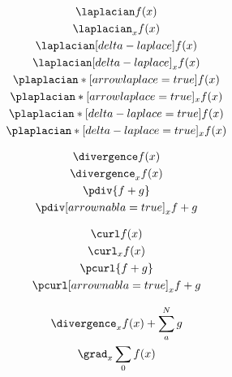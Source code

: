 \documentclass[parskip=half]{scrartcl}
\begin{document}
\begin{SideBySideExample}[xrightmargin=.3\textwidth,gobble=2]
  \begin{gather*}
    \laplacian f(x)\\
    \laplacian_{x} f(x)\\
    \laplacian[delta-laplace] f(x)\\
    \laplacian[delta-laplace]_{x} f(x)\\
    \plaplacian*[arrowlaplace=true]{f(x)}\\
    \plaplacian*[arrowlaplace=true]_{x}{f(x)}\\
    \plaplacian*[delta-laplace=true]{f(x)}\\
    \plaplacian*[delta-laplace=true]_{x}{f(x)}\\
  \end{gather*}
\end{SideBySideExample}

\fulllinerule

\begin{SideBySideExample}[xrightmargin=.3\textwidth,gobble=2]
  \begin{gather*}
    \divergence f(x) \\
    \divergence_{x} f(x) \\
    \pdiv{f+g}\\
    \pdiv[arrownabla=true]_{x}{f+g}\\
  \end{gather*}
\end{SideBySideExample}

\fulllinerule

\begin{SideBySideExample}[xrightmargin=.3\textwidth,gobble=2]
  \begin{gather*}
    \curl f(x)\\
    \curl_{x} f(x)\\
    \pcurl{f+g}\\
    \pcurl[arrownabla=true]_{x}{f+g}
  \end{gather*}
\end{SideBySideExample}

\fulllinerule

\fulllinerule

\begin{Example}[label={Interactions with Other Stuff},gobble=2]
  \begin{gather*}
    \divergence_{x} f(x) + \sum_{a}^{N} g\\
    \grad_{x}\sum_{0} f(x)
  \end{gather*}
\end{Example}
\end{document}
